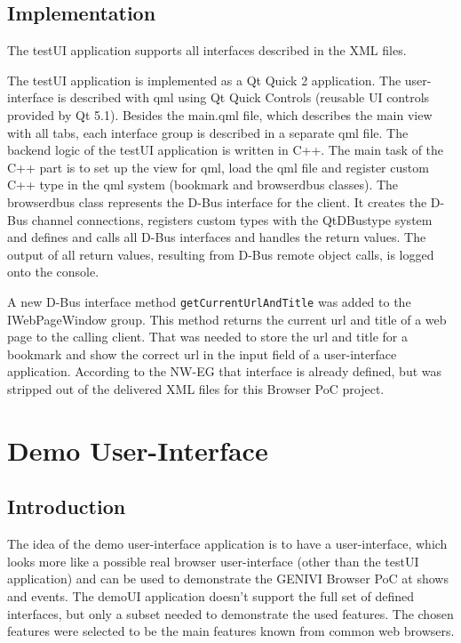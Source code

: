 \documentclass{pelagicore}
\begin{document}
\subsection{Implementation}
The testUI application supports all interfaces described in the XML files.

The testUI application is implemented as a Qt Quick 2 application. The
user-interface is described with qml using Qt Quick Controls (reusable UI
controls provided by Qt 5.1).  Besides the main.qml file, which describes the
main view with all tabs, each interface group is described in a separate qml
file. The backend logic of the testUI application is written in C++. The main
task of the C++ part is to set up the view for qml, load the qml file and
register custom C++ type in the qml system (bookmark and browserdbus classes).
The browserdbus class represents the D-Bus interface for the client. It creates
the D-Bus channel connections, registers custom types with the QtDBustype system
and defines and calls all D-Bus interfaces and handles the return values. The
output of all return values, resulting from D-Bus remote object calls, is logged
onto the console.

A new D-Bus interface method {\tt getCurrentUrlAndTitle} was added to the
IWebPageWindow group. This method returns the current url and title of a web
page to the calling client. That was needed to store the url and title for a
bookmark and show the correct url in the input field of a user-interface
application. According to the NW-EG that interface is already defined, but was
stripped out of the delivered XML files for this Browser PoC project.

\section{Demo User-Interface}
\subsection {Introduction}
The idea of the demo user-interface application is to have a user-interface,
which looks more like a possible real browser user-interface (other than the
testUI application) and can be used to demonstrate the GENIVI Browser PoC at
shows and events. The demoUI application doesn’t support the full set of
defined interfaces, but only a subset needed to demonstrate the used features.
The chosen features were selected to be the main features known from common web
browsers.
\end{document}
